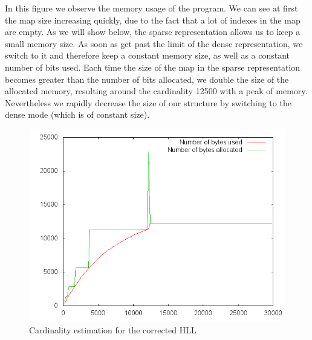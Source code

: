 \documentclass{article}
\begin{document}
In this figure we observe the memory usage of the program. We can see at first the map size increasing quickly, 
due to the fact that a lot of indexes in the map are empty. As we will show below, the sparse representation allows
 us to keep a small memory size. As soon as get past the limit of the dense representation, we switch to it and 
 therefore keep a constant memory size, as well as a constant number of bits used. Each time the size of the map
 in the sparse representation becomes greater than the number of bits allocated, we double the size of the allocated memory, resulting around the cardinality 12500 with a peak of memory. Nevertheless we rapidly decrease the size of our structure by switching to the dense mode (which is of constant size).\\
 
 
\begin{center}
\begin{figure}[h]
\includegraphics[scale=0.7]{plot_memoryUsage.png}
\caption{Cardinality estimation for the corrected HLL}
\end{figure}
\end{center}
\end{document}
